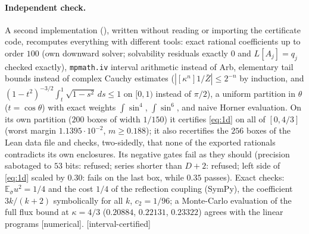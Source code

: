 \documentclass[11pt,a4paper]{article}
\theoremstyle{remark}
\theoremstyle{definition}
\theoremstyle{plain}
\theoremstyle{remark}
\newcommand{\E}{\mathbb{E}}
\newcommand{\st}[1]{\textsf{[#1]}}
\newcommand{\Zb}{\bar Z}
\begin{document}
\paragraph{Independent check.} A second implementation (), written without
reading or importing the certificate code, recomputes everything with different tools: exact rational
coefficients up to order $100$ (own downward solver; solvability residuals exactly $0$ and $L[A_j]=q_j$ checked
exactly), \texttt{mpmath.iv} interval arithmetic instead of Arb, elementary tail bounds instead of complex Cauchy
estimates ($|[\kappa^n]1/\Zb|\le2^{-n}$ by induction, and $(1-t^2)^{-3/2}\int_t^1\sqrt{1-s^2}\,ds\le1$ on $[0,1)$ instead of
$\pi/2$), a uniform partition in $\theta$ ($t=\cos\theta$) with exact weights $\int\sin^4$, $\int\sin^6$, and naive
Horner evaluation. On its own partition ($200$ boxes of width $1/150$) it certifies \eqref{eq:1d} on all of
$[0,4/3]$ (worst margin $1.1395\cdot10^{-2}$, $m\ge0.188$); it also recertifies the $256$ boxes of the Lean data
file and checks, two-sidedly, that none of the exported rationals contradicts its own enclosures. Its negative
gates fail as they should (precision sabotaged to $53$ bits: refused; series shorter than $D+2$: refused; left
side of \eqref{eq:1d} scaled by $0.30$: fails on the last box, while $0.35$ passes).
Exact checks: $\E_{\bar\sigma}u^2=1/4$ and the cost $1/4$ of the reflection coupling (SymPy), the coefficient
$3k/(k+2)$ symbolically for all $k$, $c_2=1/96$; a Monte-Carlo evaluation of the full flux bound at $\kappa=4/3$
($0.20884$, $0.22131$, $0.23322$) agrees with the linear programs \st{numerical}. \st{interval-certified}
\end{document}
